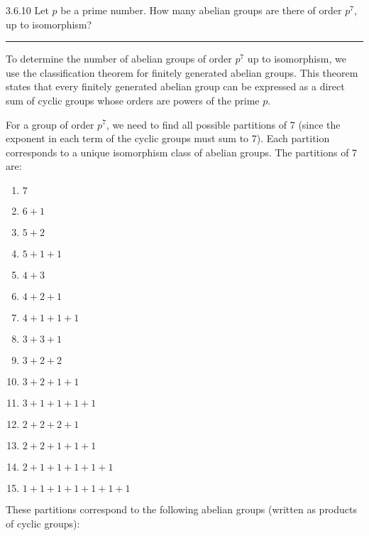 \documentclass[12pt]{amsart}
\theoremstyle{definition}
\numberwithin{equation}{section}
\begin{document}
\begin{exercise}{3.6.10} Let \(p\) be a prime number. How many abelian groups are there of order \(p^7\), up to isomorphism?

    \noindent\rule{\linewidth}{1pt}

    To determine the number of abelian groups of order \(p^7\) up to isomorphism, we use the classification theorem for finitely generated abelian groups. This theorem states that every finitely generated abelian group can be expressed as a direct sum of cyclic groups whose orders are powers of the prime \(p\). 
    
    For a group of order \(p^7\), we need to find all possible partitions of 7 (since the exponent in each term of the cyclic groups must sum to 7). Each partition corresponds to a unique isomorphism class of abelian groups. The partitions of 7 are:
    
    \begin{enumerate}[label= (\arabic*)]
        \item \(7\)
        \item \(6 + 1\)
        \item \(5 + 2\)
        \item \(5 + 1 + 1\)
        \item \(4 + 3\)
        \item \(4 + 2 + 1\)
        \item \(4 + 1 + 1 + 1\)
        \item \(3 + 3 + 1\)
        \item \(3 + 2 + 2\)
        \item \(3 + 2 + 1 + 1\)
        \item \(3 + 1 + 1 + 1 + 1\)
        \item \(2 + 2 + 2 + 1\)
        \item \(2 + 2 + 1 + 1 + 1\)
        \item \(2 + 1 + 1 + 1 + 1 + 1\)
        \item \(1 + 1 + 1 + 1 + 1 + 1 + 1\)
    \end{enumerate}
    
    These partitions correspond to the following abelian groups (written as products of cyclic groups):
    

\end{exercise}
\end{document}
